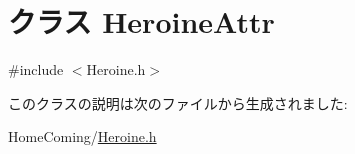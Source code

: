 \hypertarget{class_heroine_attr}{\section{クラス Heroine\-Attr}
\label{class_heroine_attr}
}


{\ttfamily \#include $<$Heroine.\-h$>$}



このクラスの説明は次のファイルから生成されました\-:\begin{DoxyCompactItemize}
\item 
Home\-Coming/\hyperlink{_heroine_8h}{Heroine.\-h}\end{DoxyCompactItemize}
